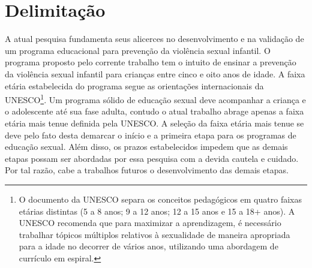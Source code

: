 



\section{Delimitação}\label{sec:Escopo}

A atual pesquisa fundamenta seus alicerces no desenvolvimento e na validação de um programa educacional para prevenção da violência sexual infantil. O programa proposto pelo corrente trabalho tem o intuito de ensinar a prevenção da violência sexual infantil para crianças entre cinco e oito anos de idade. A faixa etária estabelecida do programa segue as orientações internacionais da UNESCO\footnote{O documento da UNESCO separa os conceitos pedagógicos em quatro faixas etárias distintas (5 a 8 anos; 9 a 12 anos; 12 a 15 anos e 15 a 18+ anos). A UNESCO recomenda que para maximizar a aprendizagem, é necessário trabalhar tópicos múltiplos relativos à sexualidade de maneira apropriada para a idade no decorrer de vários anos, utilizando uma abordagem de currículo em espiral.}. Um programa sólido de educação sexual deve acompanhar a criança e o adolescente até sua fase adulta, contudo o atual trabalho abrage apenas a faixa etária mais tenue definida pela UNESCO. A seleção da faixa etária mais tenue se deve pelo fato desta demarcar o início e a primeira etapa para os programas de educação sexual. Além disso, os prazos estabelecidos impedem que as demais etapas possam ser abordadas por essa pesquisa com a devida cautela e cuidado. Por tal razão, cabe a trabalhos futuros o desenvolvimento das demais etapas.

